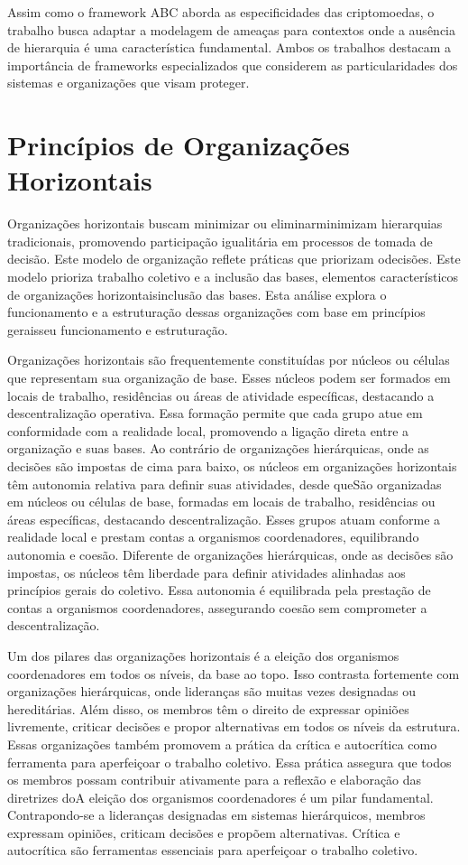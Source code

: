 Assim como o framework ABC aborda as especificidades das criptomoedas, o
trabalho busca adaptar a modelagem de ameaças para contextos onde a
ausência de hierarquia é uma característica fundamental. Ambos os trabalhos
destacam a importância de frameworks especializados que considerem as
particularidades dos sistemas e organizações que visam proteger.

\section{Princípios de Organizações Horizontais}
\label{sec:introduction}

Organizações horizontais buscam minimizar ou eliminarminimizam
hierarquias tradicionais, promovendo participação igualitária em processos de tomada
de decisão. Este modelo de organização reflete práticas que priorizam
odecisões. Este modelo prioriza trabalho coletivo e a inclusão das bases, elementos
característicos de organizações horizontaisinclusão das bases. Esta análise explora o
funcionamento e a estruturação dessas organizações com base em princípios geraisseu
funcionamento e estruturação. 

Organizações horizontais são frequentemente constituídas por núcleos ou
células que representam sua organização de base. Esses núcleos podem ser formados
em locais de trabalho, residências ou áreas de atividade específicas,
destacando a descentralização operativa. Essa formação permite que cada grupo atue
em conformidade com a realidade local, promovendo a ligação direta entre a
organização e suas bases. Ao contrário de organizações hierárquicas, onde as decisões
são impostas de cima para baixo, os núcleos em organizações horizontais têm
autonomia relativa para definir suas atividades, desde queSão organizadas em
núcleos ou células de base, formadas em locais de trabalho, residências ou áreas
específicas, destacando descentralização. Esses grupos atuam conforme a realidade
local e prestam contas a organismos coordenadores, equilibrando autonomia e
coesão. Diferente de organizações hierárquicas, onde as decisões são impostas, os
núcleos têm liberdade para definir atividades alinhadas aos princípios gerais do
coletivo. Essa autonomia é equilibrada pela prestação de contas a organismos
coordenadores, assegurando coesão sem comprometer a descentralização. 

Um dos pilares das organizações horizontais é a eleição dos organismos
coordenadores em todos os níveis, da base ao topo. Isso contrasta fortemente com
organizações hierárquicas, onde lideranças são muitas vezes designadas ou
hereditárias. Além disso, os membros têm o direito de expressar opiniões livremente,
criticar decisões e propor alternativas em todos os níveis da estrutura. Essas
organizações também promovem a prática da crítica e autocrítica como ferramenta para
aperfeiçoar o trabalho coletivo. Essa prática assegura que todos os membros possam
contribuir ativamente para a reflexão e elaboração das diretrizes doA eleição dos
organismos coordenadores é um pilar fundamental. Contrapondo-se a lideranças
designadas em sistemas hierárquicos, membros expressam opiniões, criticam decisões e
propõem alternativas. Crítica e autocrítica são ferramentas essenciais para
aperfeiçoar o trabalho coletivo. 

